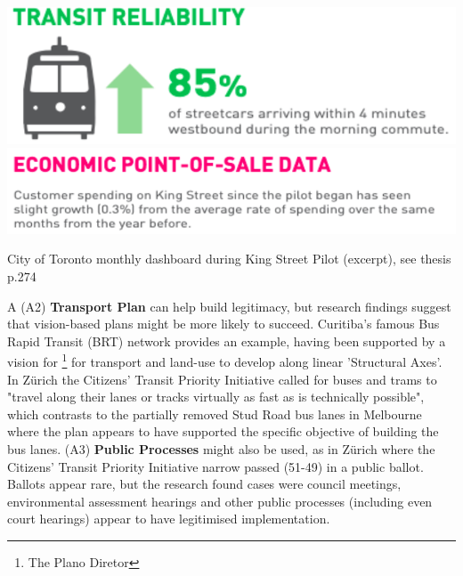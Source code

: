 \documentclass{tufte-handout}
\begin{document}
\begin{marginfigure}%
  \includegraphics[width=\linewidth]{Toronto_dashboard_1}
   \includegraphics[width=\linewidth]{Toronto_dashboard_4}
  \caption{City of Toronto monthly dashboard during King Street Pilot (excerpt), see thesis p.274}
  \label{fig:Toronto_dashboard}
\end{marginfigure}

A (A2) \textbf{Transport Plan} can help build legitimacy, but research findings suggest that vision-based plans might be more likely to succeed. Curitiba's famous Bus Rapid Transit (BRT) network provides an example, having been supported by a vision for \footnote{The Plano Diretor} for transport and land-use to develop along linear 'Structural Axes'. In Zürich the Citizens' Transit Priority Initiative called for buses and trams to "travel along their lanes or tracks virtually as fast as is technically possible"\cite{Nash:2001ab}, which contrasts to the partially removed Stud Road bus lanes in Melbourne where the plan appears to have supported the specific objective of building the bus lanes. (A3) \textbf{Public Processes} might also be used, as in Zürich where the Citizens' Transit Priority Initiative narrow passed (51-49) in a public ballot. Ballots appear rare, but the research found cases were council meetings, environmental assessment hearings and other public processes (including even court hearings) appear to have legitimised implementation.  
\end{document}
